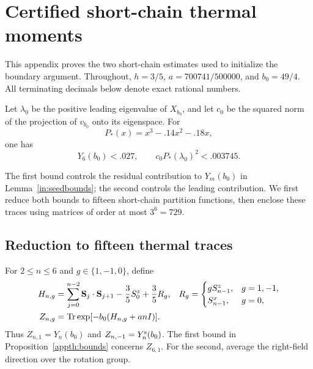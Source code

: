 \section{Certified short-chain thermal moments}\label{app:thermal}

This appendix proves the two short-chain estimates used to initialize the
boundary argument. Throughout, $h=3/5$, $a=700741/500000$, and $b_0=49/4$.
All terminating decimals below denote exact rational numbers.

\begin{proposition}\label{appth:bounds}
Let $\lambda_0$ be the positive leading eigenvalue of $X_{b_0}$, and let
$c_0$ be the squared norm of the projection of $v_{b_0}$ onto its eigenspace.
For
\[
 P_*(x)=x^3-.14x^2-.18x,
\]
one has
\begin{equation}\label{appth:conclusions}
 Y_6(b_0)<.027,
 \qquad c_0P_*(\lambda_0)^2<.003745.
\end{equation}
\end{proposition}

The first bound controls the residual contribution to $Y_m(b_0)$ in
Lemma~\ref{in:seedbounds}; the second controls the leading contribution.
We first reduce both bounds to fifteen short-chain partition functions,
then enclose these traces using matrices of order at most $3^6=729$.

\subsection{Reduction to fifteen thermal traces}

For $2\le n\le6$ and $g\in\{1,-1,0\}$, define
\begin{align}
 H_{n,g}
 &=\sum_{j=0}^{n-2}\mathbf S_j\mathbin\cdot\mathbf S_{j+1}
       -\frac35S_0^z+\frac35R_g,
 &
 R_g&=
 \begin{cases}
    gS_{n-1}^z,&g=1,-1,\\
    S_{n-1}^x,&g=0,
 \end{cases}
 \label{appth:H}\\
 Z_{n,g}&=\operatorname{Tr}\exp[-b_0(H_{n,g}+anI)].\nonumber
\end{align}
Thus $Z_{n,1}=Y_n(b_0)$ and $Z_{n,-1}=Y_n^{\rm s}(b_0)$.
The first bound in Proposition~\ref{appth:bounds} concerns $Z_{6,1}$.
For the second, average the right-field direction over the rotation group.

